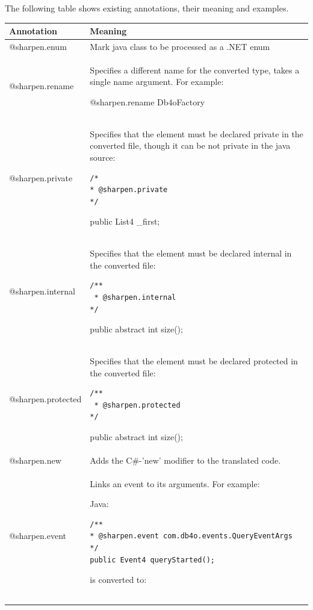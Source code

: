 The following table shows existing annotations, their meaning and examples.

{\small
\begin{longtable}{|p{}|p{}|}
\hline
\textbf{Annotation} & \textbf{Meaning} \\ \hline
@sharpen.enum & Mark java class to be processed as a .NET enum \\ \hline
@sharpen.rename & Specifies a different name for the converted type, takes a single name argument. For example:\par @sharpen.rename Db4oFactory \\ \hline
@sharpen.private & Specifies that the element must be declared private in the converted file, though it can be not private in the java source:\par \begin{lstlisting}
/*
* @sharpen.private
*/
\end{lstlisting}\par public List4 \_first; \\ \hline
@sharpen.internal & Specifies that the element must be declared internal in the converted file:\par \begin{lstlisting}
/**
 * @sharpen.internal
*/
\end{lstlisting}\par public abstract int size(); \\ \hline
@sharpen.protected & Specifies that the element must be declared protected in the converted file:\par \begin{lstlisting}
/**
 * @sharpen.protected
*/
\end{lstlisting}\par public abstract int size(); \\ \hline
@sharpen.new & Adds the C\#-'new' modifier to the translated code. \\ \hline
@sharpen.event & Links an event to its arguments. For example:\par Java:\par \begin{lstlisting}
/**
* @sharpen.event com.db4o.events.QueryEventArgs
*/
public Event4 queryStarted();
\end{lstlisting}\par is converted to:\par \begin{lstlisting}

\end{lstlisting}
\end{longtable}}
